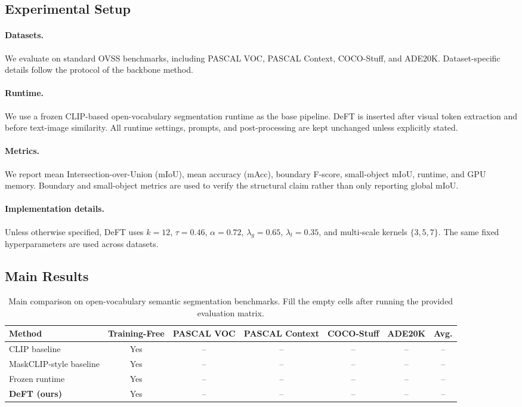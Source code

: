 \documentclass[letterpaper]{article}
\begin{document}
\subsection{Experimental Setup}

\paragraph{Datasets.}
We evaluate on standard OVSS benchmarks, including PASCAL VOC, PASCAL Context,
COCO-Stuff, and ADE20K. Dataset-specific details follow the protocol of the
backbone method.

\paragraph{Runtime.}
We use a frozen CLIP-based open-vocabulary segmentation runtime as the base
pipeline. DeFT is inserted after visual token extraction and before text-image similarity.
All runtime settings, prompts, and post-processing are kept unchanged unless
explicitly stated.

\paragraph{Metrics.}
We report mean Intersection-over-Union (mIoU), mean accuracy (mAcc), boundary
F-score, small-object mIoU, runtime, and GPU memory. Boundary and small-object
metrics are used to verify the structural claim rather than only reporting
global mIoU.

\paragraph{Implementation details.}
Unless otherwise specified, DeFT uses $k=12$, $\tau=0.46$, $\alpha=0.72$,
$\lambda_g=0.65$, $\lambda_l=0.35$, and multi-scale kernels $\{3,5,7\}$.
The same fixed hyperparameters are used across datasets.

\subsection{Main Results}

\begin{table}[t]
\centering
\caption{Main comparison on open-vocabulary semantic segmentation benchmarks.
Fill the empty cells after running the provided evaluation matrix.}
\begin{tabular}{lcccccc}
\toprule
Method & Training-Free & PASCAL VOC & PASCAL Context & COCO-Stuff & ADE20K & Avg. \\
\midrule
CLIP baseline & Yes & -- & -- & -- & -- & -- \\
MaskCLIP-style baseline & Yes & -- & -- & -- & -- & -- \\
Frozen runtime & Yes & -- & -- & -- & -- & -- \\
\textbf{DeFT (ours)} & Yes & -- & -- & -- & -- & -- \\
\bottomrule
\end{tabular}
\end{table}
\end{document}
